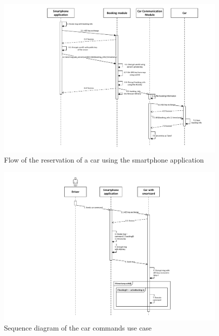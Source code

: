 \documentclass[12pt,a4paper, oneside]{article}
\begin{document}
\begin{figure}[H]
\centering
\includegraphics[width=\textwidth]{assets/sequencediagram-booking}
\caption{Flow of the reservation of a car using the smartphone application}
\label{fig:sequencediagram-booking}
\end{figure}


\begin{figure}[H]
\centering
\includegraphics[width=.9\textwidth]{assets/sequencediagram-carcommands}
\caption{Sequence diagram of the car commands use case}
\label{fig:sequencediagram-carcommands}
\end{figure}
\end{document}
